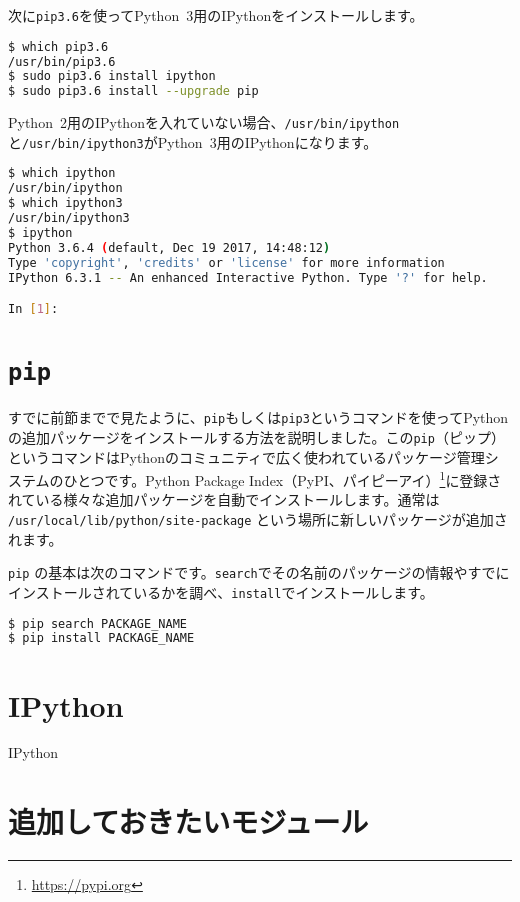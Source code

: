 次に\texttt{pip3.6}を使ってPython~3用のIPythonをインストールします。

\begin{lstlisting}[language=bash]
$ which pip3.6 
/usr/bin/pip3.6
$ sudo pip3.6 install ipython
$ sudo pip3.6 install --upgrade pip
\end{lstlisting}

Python~2用のIPythonを入れていない場合、\texttt{/usr/bin/ipython}と\texttt{/usr/bin/ipython3}がPython~3用のIPythonになります。

\begin{lstlisting}[language=bash]
$ which ipython
/usr/bin/ipython
$ which ipython3
/usr/bin/ipython3
$ ipython
Python 3.6.4 (default, Dec 19 2017, 14:48:12) 
Type 'copyright', 'credits' or 'license' for more information
IPython 6.3.1 -- An enhanced Interactive Python. Type '?' for help.

In [1]:
\end{lstlisting}

\section{\texttt{pip}}

すでに前節までで見たように、\texttt{pip}もしくは\texttt{pip3}というコマンドを使ってPythonの追加パッケージをインストールする方法を説明しました。この\texttt{pip}（ピップ）というコマンドはPythonのコミュニティで広く使われているパッケージ管理システムのひとつです。Python Package Index（PyPI、パイピーアイ）\footnote{\url{https://pypi.org}}に登録されている様々な追加パッケージを自動でインストールします。通常は \texttt{/usr/local/lib/python/site-package} という場所に新しいパッケージが追加されます。

\texttt{pip} の基本は次のコマンドです。\texttt{search}でその名前のパッケージの情報やすでにインストールされているかを調べ、\texttt{install}でインストールします。
\begin{lstlisting}[language=bash]
$ pip search PACKAGE_NAME
$ pip install PACKAGE_NAME
\end{lstlisting}  

\section{IPython}
IPython

\section{追加しておきたいモジュール}

